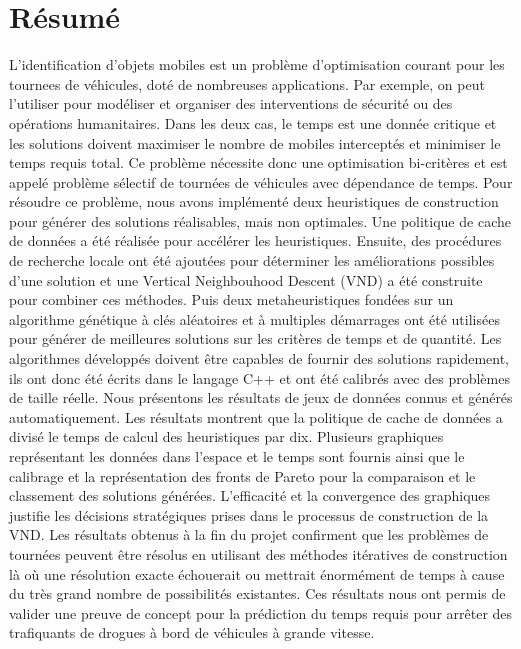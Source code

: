 \section*{Résumé}

L'identification d'objets mobiles est un problème d'optimisation courant pour les \glspl{tournee} de véhicules, doté de nombreuses applications. Par exemple, on peut l'utiliser pour modéliser et organiser des interventions de sécurité ou des opérations humanitaires. Dans les deux cas, le temps est une donnée critique et les solutions doivent maximiser le nombre de mobiles interceptés et minimiser le temps requis total. Ce problème nécessite donc une optimisation bi-critères et est appelé problème sélectif de tournées de véhicules avec dépendance de temps. Pour résoudre ce problème, nous avons implémenté deux \glspl{heuristique} de construction pour générer des solutions réalisables, mais non optimales. Une politique de cache de données a été réalisée pour accélérer les heuristiques. Ensuite, des procédures de recherche locale ont été ajoutées pour déterminer les améliorations possibles d'une solution et une Vertical Neighbouhood Descent (VND) a été construite pour combiner ces méthodes. Puis deux \glspl{metaheuristique} fondées sur un algorithme génétique à clés aléatoires et à multiples démarrages ont été utilisées pour générer de meilleures solutions sur les critères de temps et de quantité. Les algorithmes développés doivent être capables de fournir des solutions rapidement, ils ont donc été écrits dans le langage C++ et ont été calibrés avec des problèmes de taille réelle. Nous présentons les résultats de jeux de données connus et générés automatiquement. Les résultats montrent que la politique de cache de données a divisé le temps de calcul des heuristiques par dix. Plusieurs graphiques représentant les données dans l'espace et le temps sont fournis ainsi que le calibrage et la représentation des fronts de Pareto pour la comparaison et le classement des solutions générées. L'efficacité et la convergence des graphiques justifie les décisions stratégiques prises dans le processus de construction de la VND. Les résultats obtenus à la fin du projet confirment que les problèmes de tournées peuvent être résolus en utilisant des méthodes itératives de construction là où une résolution exacte échouerait ou mettrait énormément de temps à cause du très grand nombre de possibilités existantes. Ces résultats nous ont permis de valider une preuve de concept pour la prédiction du temps requis pour arrêter des trafiquants de drogues à bord de véhicules à grande vitesse.

